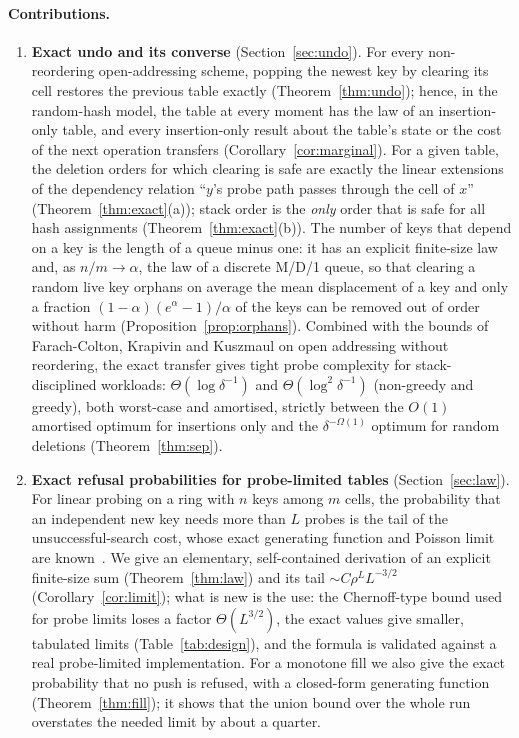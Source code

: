 \documentclass[11pt,a4paper]{article}
\theoremstyle{definition}
\theoremstyle{remark}
\begin{document}
\paragraph{Contributions.}
\begin{enumerate}[leftmargin=*,label=\textbf{C\arabic*.}]
\item \textbf{Exact undo and its converse} (Section~\ref{sec:undo}). For every non-reordering open-addressing scheme, popping the newest key by clearing its cell restores the previous table exactly (Theorem~\ref{thm:undo}); hence, in the random-hash model, the table at every moment has the law of an insertion-only table, and every insertion-only result about the table's state or the cost of the next operation transfers (Corollary~\ref{cor:marginal}). For a given table, the deletion orders for which clearing is safe are exactly the linear extensions of the dependency relation ``$y$'s probe path passes through the cell of $x$'' (Theorem~\ref{thm:exact}(a)); stack order is the \emph{only} order that is safe for all hash assignments (Theorem~\ref{thm:exact}(b)). The number of keys that depend on a key is the length of a queue minus one: it has an explicit finite-size law and, as $n/m\to\alpha$, the law of a discrete M/D/1 queue, so that clearing a random live key orphans on average the mean displacement of a key and only a fraction $(1-\alpha)(e^{\alpha}-1)/\alpha$ of the keys can be removed out of order without harm (Proposition~\ref{prop:orphans}). Combined with the bounds of Farach-Colton, Krapivin and Kuszmaul on open addressing without reordering, the exact transfer gives tight probe complexity for stack-disciplined workloads: $\Theta(\log\delta^{-1})$ and $\Theta(\log^2\delta^{-1})$ (non-greedy and greedy), both worst-case and amortised, strictly between the $O(1)$ amortised optimum for insertions only and the $\delta^{-\Omega(1)}$ optimum for random deletions (Theorem~\ref{thm:sep}).
\item \textbf{Exact refusal probabilities for probe-limited tables} (Section~\ref{sec:law}). For linear probing on a ring with $n$ keys among $m$ cells, the probability that an independent new key needs more than $L$ probes is the tail of the unsuccessful-search cost, whose exact generating function and Poisson limit are known~\cite{janson2016,knuth3}. We give an elementary, self-contained derivation of an explicit finite-size sum (Theorem~\ref{thm:law}) and its tail $\sim C\rho^{L}L^{-3/2}$ (Corollary~\ref{cor:limit}); what is new is the use: the Chernoff-type bound used for probe limits loses a factor $\Theta(L^{3/2})$, the exact values give smaller, tabulated limits (Table~\ref{tab:design}), and the formula is validated against a real probe-limited implementation. For a monotone fill we also give the exact probability that no push is refused, with a closed-form generating function (Theorem~\ref{thm:fill}); it shows that the union bound over the whole run overstates the needed limit by about a quarter.

\end{enumerate}
\end{document}
